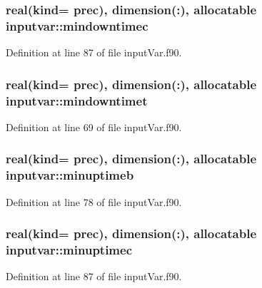 \hypertarget{classinputvar_a9bb1424e04e5c89d561d2316045f98d4}{
\subsubsection[{mindowntimec}]{\setlength{\rightskip}{0pt plus 5cm}real(kind= prec), dimension(\-:), allocatable inputvar\-::mindowntimec}}\label{classinputvar_a9bb1424e04e5c89d561d2316045f98d4}


Definition at line 87 of file input\-Var.\-f90.

\hypertarget{classinputvar_aca351a4427897a65d991d46243fadc34}{
\subsubsection[{mindowntimet}]{\setlength{\rightskip}{0pt plus 5cm}real(kind= prec), dimension(\-:), allocatable inputvar\-::mindowntimet}}\label{classinputvar_aca351a4427897a65d991d46243fadc34}


Definition at line 69 of file input\-Var.\-f90.

\hypertarget{classinputvar_a699644b9b98282661cd55dc10d96dbcb}{
\subsubsection[{minuptimeb}]{\setlength{\rightskip}{0pt plus 5cm}real(kind= prec), dimension(\-:), allocatable inputvar\-::minuptimeb}}\label{classinputvar_a699644b9b98282661cd55dc10d96dbcb}


Definition at line 78 of file input\-Var.\-f90.

\hypertarget{classinputvar_a1c2a4cc32567b94cb7a884d3731bb5f4}{
\subsubsection[{minuptimec}]{\setlength{\rightskip}{0pt plus 5cm}real(kind= prec), dimension(\-:), allocatable inputvar\-::minuptimec}}\label{classinputvar_a1c2a4cc32567b94cb7a884d3731bb5f4}


Definition at line 87 of file input\-Var.\-f90.

